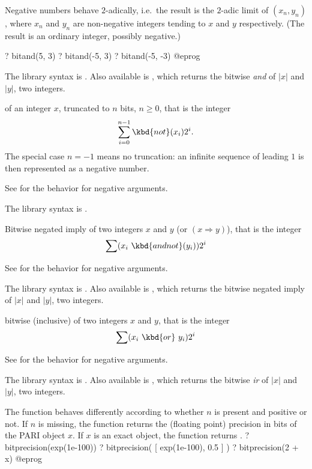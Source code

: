 Negative numbers behave $2$-adically, i.e.~the result is the $2$-adic limit
of $(x_n,y_n)$, where $x_n$ and $y_n$ are non-negative integers
tending to $x$ and $y$ respectively. (The result is an ordinary integer,
possibly negative.)

\bprog
? bitand(5, 3)
? bitand(-5, 3)
? bitand(-5, -3)
@eprog

The library syntax is .
Also available is
, which returns the bitwise \emph{and}
of $|x|$ and $|y|$, two integers.

\label{se:bitneg}
 of an integer $x$,
truncated to $n$ bits, $n\geq 0$, that is the integer
$$\sum_{i=0}^{n-1} \kbd{not}(x_i) 2^i.$$
The special case $n=-1$ means no truncation: an infinite sequence of
leading $1$ is then represented as a negative number.

See  for the behavior for negative arguments.

The library syntax is .

\label{se:bitnegimply}
Bitwise negated imply of two integers $x$ and
$y$ (or  $(x \Rightarrow y)$), that is the integer $$\sum
(x_i~\kbd{and not}(y_i)) 2^i$$

See  for the behavior for negative arguments.

The library syntax is .
Also available is
, which returns the bitwise negated
imply of $|x|$ and $|y|$, two integers.

\label{se:bitor}
bitwise (inclusive)
 of two integers $x$ and $y$, that is the integer $$\sum
(x_i~\kbd{or}~y_i) 2^i$$

See  for the behavior for negative arguments.

The library syntax is .
Also available is
, which returns the bitwise \emph{ir}
of $|x|$ and $|y|$, two integers.

\label{se:bitprecision}
The function behaves differently according to whether $n$ is
present and positive or not. If $n$ is missing, the function returns the
(floating point) precision in bits of the PARI object $x$. If $x$ is an
exact object, the function returns .
\bprog
? bitprecision(exp(1e-100))
? bitprecision( [ exp(1e-100), 0.5 ] )
? bitprecision(2 + x)
@eprog

